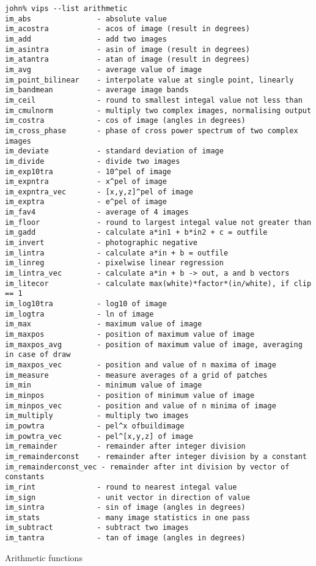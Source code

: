 \begin{fig2}
\begin{verbatim}
john% vips --list arithmetic
im_abs               - absolute value
im_acostra           - acos of image (result in degrees)
im_add               - add two images
im_asintra           - asin of image (result in degrees)
im_atantra           - atan of image (result in degrees)
im_avg               - average value of image
im_point_bilinear    - interpolate value at single point, linearly
im_bandmean          - average image bands
im_ceil              - round to smallest integal value not less than
im_cmulnorm          - multiply two complex images, normalising output
im_costra            - cos of image (angles in degrees)
im_cross_phase       - phase of cross power spectrum of two complex images
im_deviate           - standard deviation of image
im_divide            - divide two images
im_exp10tra          - 10^pel of image
im_expntra           - x^pel of image
im_expntra_vec       - [x,y,z]^pel of image
im_exptra            - e^pel of image
im_fav4              - average of 4 images
im_floor             - round to largest integal value not greater than
im_gadd              - calculate a*in1 + b*in2 + c = outfile
im_invert            - photographic negative
im_lintra            - calculate a*in + b = outfile
im_linreg            - pixelwise linear regression
im_lintra_vec        - calculate a*in + b -> out, a and b vectors
im_litecor           - calculate max(white)*factor*(in/white), if clip == 1
im_log10tra          - log10 of image
im_logtra            - ln of image
im_max               - maximum value of image
im_maxpos            - position of maximum value of image
im_maxpos_avg        - position of maximum value of image, averaging in case of draw
im_maxpos_vec        - position and value of n maxima of image
im_measure           - measure averages of a grid of patches
im_min               - minimum value of image
im_minpos            - position of minimum value of image
im_minpos_vec        - position and value of n minima of image
im_multiply          - multiply two images
im_powtra            - pel^x ofbuildimage
im_powtra_vec        - pel^[x,y,z] of image
im_remainder         - remainder after integer division
im_remainderconst    - remainder after integer division by a constant
im_remainderconst_vec - remainder after int division by vector of constants
im_rint              - round to nearest integal value
im_sign              - unit vector in direction of value
im_sintra            - sin of image (angles in degrees)
im_stats             - many image statistics in one pass
im_subtract          - subtract two images
im_tantra            - tan of image (angles in degrees)
\end{verbatim}
\caption{Arithmetic functions}
\label{fg:arithmetic}
\end{fig2}


